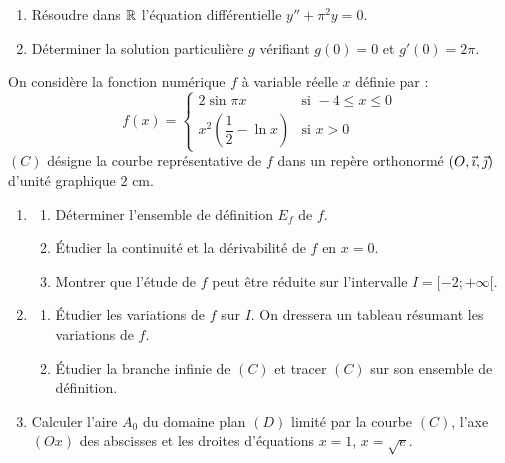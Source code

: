 \documentclass[11pt]{article}
\begin{document}

\begin{enumerate}
  \item Résoudre dans $\mathbb{R}$ l'équation différentielle $y'' + \pi^2 y = 0$.
  \item Déterminer la solution particulière $g$ vérifiant $g(0) = 0$ et $g'(0) = 2\pi$.
\end{enumerate}

On considère la fonction numérique $f$ à variable réelle $x$ définie par :
\[ f(x) = \begin{cases} 2\sin \pi x & \text{si } -4 \le x \le 0 \\[1ex] x^2\left(\dfrac{1}{2} - \ln x\right) & \text{si } x > 0 \end{cases} \]
$(C)$ désigne la courbe représentative de $f$ dans un repère orthonormé $(O,\vec{\imath},\vec{\jmath})$ d'unité graphique $2$ cm.

\begin{enumerate}[start=3]
  \item \begin{enumerate}[label=\alph*.]
    \item Déterminer l'ensemble de définition $E_f$ de $f$.
    \item Étudier la continuité et la dérivabilité de $f$ en $x = 0$.
    \item Montrer que l'étude de $f$ peut être réduite sur l'intervalle $I = [-2;+\infty[$.
  \end{enumerate}
  \item \begin{enumerate}[label=\alph*.]
    \item Étudier les variations de $f$ sur $I$. On dressera un tableau résumant les variations de $f$.
    \item Étudier la branche infinie de $(C)$ et tracer $(C)$ sur son ensemble de définition.
  \end{enumerate}
  \item Calculer l'aire $A_0$ du domaine plan $(D)$ limité par la courbe $(C)$, l'axe $(Ox)$ des abscisses et les droites d'équations $x = 1$, $x = \sqrt{e}$.
\end{enumerate}
\end{document}
